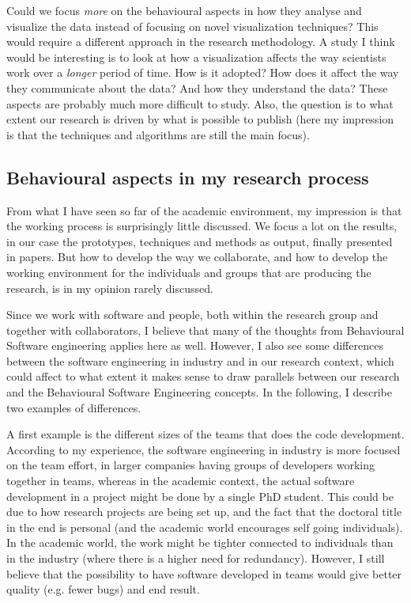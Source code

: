 \documentclass[11pt]{article}
\begin{document}
Could we focus \emph{more} on the behavioural aspects in how they analyse and visualize the data instead of focusing on novel visualization techniques? 
This would require a different approach in the research methodology.
A study I think would be interesting is to look at how a visualization affects the way scientists work over a \emph{longer} period of time. How is it adopted? How does it affect the way they communicate about the data? And how they understand the data?
These aspects are probably much more difficult to study. 
Also, the question is to what extent our research is driven by what is possible to publish (here my impression is that the techniques and algorithms are still the main focus).


\subsection{Behavioural aspects in my research process}

From what I have seen so far of the academic environment, my impression is that the working process is surprisingly little discussed.
We focus a lot on the results, in our case the prototypes, techniques and methods as output, finally presented in papers. But how to develop the way we collaborate, and how to develop the working environment for the individuals and groups that are producing the research, is in my opinion rarely discussed. 

Since we work with software and people, both within the research group and together with collaborators, I believe that many of the thoughts from Behavioural Software engineering applies here as well. 
However, I also see some differences between the software engineering in industry and in our research context, which could affect to what extent it makes sense to draw parallels between our research and the Behavioural Software Engineering concepts.
In the following, I describe two examples of differences. 

A first example is the different sizes of the teams that does the code development.
According to my experience, the software engineering in industry is more focused on the team effort, in larger companies having groups of developers working together in teams, whereas in the academic context, the actual software development in a project might be done by a single PhD student. This could be due to how research projects are being set up, and the fact that the doctoral title in the end is personal (and the academic world encourages self going individuals). 
In the academic world, the work might be tighter connected to individuals than in the industry (where there is a higher need for redundancy).
However, I still believe that the possibility to have software developed in teams would give better quality (e.g. fewer bugs) and end result.
\end{document}
